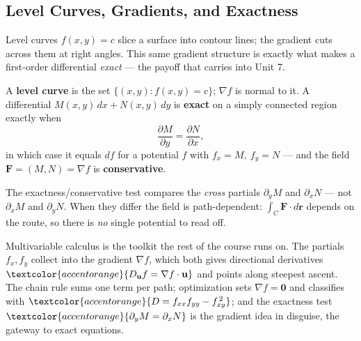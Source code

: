 \subsection{Level Curves, Gradients, and Exactness}

Level curves $f(x,y)=c$ slice a surface into contour lines; the gradient cuts
across them at right angles. This same gradient structure is exactly what makes a
first-order differential \emph{exact} --- the payoff that carries into Unit 7.

\begin{formulabox}
A \textbf{level curve} is the set $\{(x,y):f(x,y)=c\}$; $\nabla f$ is normal to
it. A differential $M(x,y)\,dx+N(x,y)\,dy$ is \textbf{exact} on a simply
connected region exactly when
\[ \frac{\partial M}{\partial y} = \frac{\partial N}{\partial x}, \]
in which case it equals $df$ for a potential $f$ with $f_x=M,\ f_y=N$ --- and the
field $\mathbf F=(M,N)=\nabla f$ is \textbf{conservative}.
\end{formulabox}

\begin{warningbox}
The exactness/conservative test compares the \emph{cross} partials
$\partial_y M$ and $\partial_x N$ --- not $\partial_x M$ and $\partial_y N$. When
they differ the field is path-dependent: $\int_C\mathbf F\cdot d\mathbf r$
depends on the route, so there is \emph{no} single potential to read off.
\end{warningbox}

\begin{conceptbox}
Multivariable calculus is the toolkit the rest of the course runs on. The
\textcolor{accentorange}{partials} $f_x,f_y$ collect into the
\textcolor{accentorange}{gradient $\nabla f$}, which both gives directional
derivatives $\textcolor{accentorange}{D_{\mathbf u}f=\nabla f\cdot\mathbf u}$ and
points along steepest ascent. The \textcolor{accentorange}{chain rule} sums one
term per path; \textcolor{accentorange}{optimization} sets $\nabla f=\mathbf 0$
and classifies with $\textcolor{accentorange}{D=f_{xx}f_{yy}-f_{xy}^{\,2}}$; and
the exactness test $\textcolor{accentorange}{\partial_y M=\partial_x N}$ is the
gradient idea in disguise, the gateway to exact equations.
\end{conceptbox}


